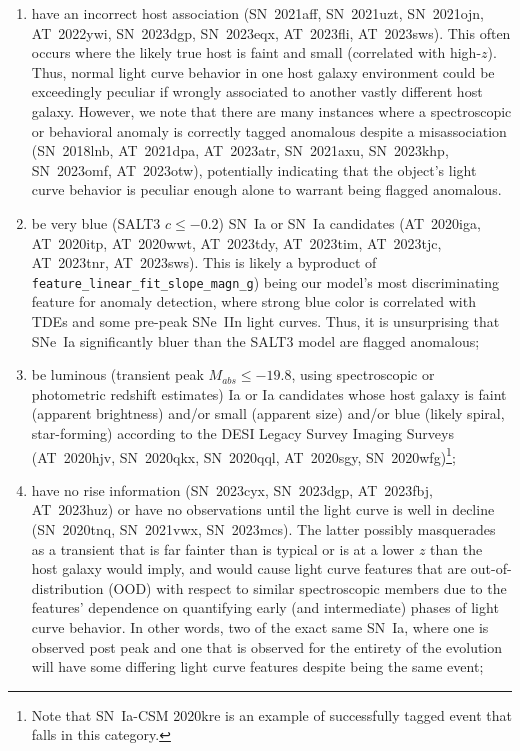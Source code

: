 \documentclass[twocolumn]{aastex63}
\begin{document}
\begin{enumerate}
    \item have an incorrect host association (SN~2021aff, SN~2021uzt, SN~2021ojn, AT~2022ywi, SN~2023dgp, SN~2023eqx, AT~2023fli, AT~2023sws). This often occurs where the likely true host is faint and small (correlated with high-$z$). Thus, normal light curve behavior in one host galaxy environment could be exceedingly peculiar if wrongly associated to another vastly different host galaxy. However, we note that there are many instances where a spectroscopic or behavioral anomaly is correctly tagged anomalous despite a misassociation (SN~2018lnb, AT~2021dpa, AT~2023atr, SN~2021axu, SN~2023khp, SN~2023omf, AT~2023otw), potentially indicating that the object's light curve behavior is peculiar enough alone to warrant being flagged anomalous. 
    \item be very blue (SALT3 $c\leq-0.2$) SN~Ia or SN~Ia candidates (AT~2020iga, AT~2020itp, AT~2020wwt, AT~2023tdy, AT~2023tim, AT~2023tjc, AT~2023tnr, AT~2023sws). This is likely a byproduct of \texttt{feature\_linear\_fit\_slope\_magn\_g}) being our model's most discriminating feature for anomaly detection, where strong blue color is correlated with TDEs and some pre-peak SNe~IIn light curves. Thus, it is unsurprising that SNe~Ia significantly bluer than the SALT3 model are flagged anomalous;
    \item be luminous (transient peak $M_{abs}\leq-19.8$, using spectroscopic or photometric redshift estimates) Ia or Ia candidates whose host galaxy is faint (apparent brightness) and/or small (apparent size) and/or blue (likely spiral, star-forming) according to the DESI Legacy Survey Imaging Surveys (AT~2020hjv, SN~2020qkx, SN~2020qql, AT~2020sgy, SN~2020wfg)\footnote{Note that SN~Ia-CSM 2020kre is an example of successfully tagged event that falls in this category.};
    \item have no rise information (SN~2023cyx, SN~2023dgp, AT~2023fbj, AT~2023huz) or have no observations until the light curve is well in decline (SN~2020tnq, SN~2021vwx, SN~2023mcs). The latter possibly masquerades as a transient that is far fainter than is typical or is at a lower $z$ than the host galaxy would imply, and would cause light curve features that are out-of-distribution (OOD) with respect to similar spectroscopic members due to the features' dependence on quantifying early (and intermediate) phases of light curve behavior. In other words, two of the exact same SN~Ia, where one is observed post peak and one that is observed for the entirety of the evolution will have some differing light curve features despite being the same event;

\end{enumerate}
\end{document}
